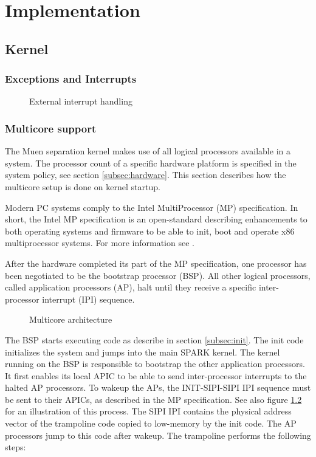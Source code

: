 \chapter{Implementation}




\section{Kernel}




\subsection{Exceptions and Interrupts}\label{subsec:excp-and-ints}
\begin{figure}[h]
	\centering
	
	\caption{External interrupt handling}
	\label{fig:external-interrupt}
\end{figure}

\subsection{Multicore support}\label{subsec:mp-support}
The Muen separation kernel makes use of all logical processors available in a
system. The processor count of a specific hardware platform is specified in the
system policy, see section \ref{subsec:hardware}. This section describes how the
multicore setup is done on kernel startup.

Modern PC systems comply to the Intel MultiProcessor (MP)
specification. In short, the Intel MP specification is an open-standard
describing enhancements to both operating systems and firmware to be able to
init, boot and operate x86 multiprocessor systems. For more information see
\cite{intel:mp}.

After the hardware completed its part of the MP specification, one processor
has been negotiated to be the bootstrap processor (BSP). All other
logical processors, called application processors (AP), halt until
they receive a specific inter-processor interrupt (IPI) sequence.

\begin{figure}[h]
	\centering
	
	\caption{Multicore architecture}
	\label{fig:mp-overview}
\end{figure}

The BSP starts executing code as describe in section \ref{subsec:init}. The
init code initializes the system and jumps into the main SPARK kernel. The
kernel running on the BSP is responsible to bootstrap the other application
processors. It first enables its local APIC to be able to send
inter-processor interrupts to the halted AP processors. To wakeup the APs, the
INIT-SIPI-SIPI IPI sequence must be sent to their APICs, as described in the MP
specification. See also figure \ref{fig:mp-overview} for an illustration of
this process. The SIPI IPI contains the physical address vector of the
trampoline code copied to low-memory by the init code. The AP processors jump
to this code after wakeup. The trampoline performs the following steps:

